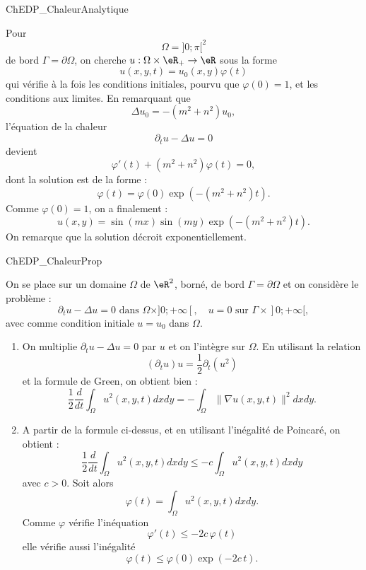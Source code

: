\medskip

\begin{corrige}{ChEDP_ChaleurAnalytique}

Pour 
$$ \Omega = ] 0 ; \pi [^2$$
de bord $\Gamma = \partial \Omega$,
on cherche $u : \Omega \times \eR_+ \rightarrow \eR$
sous la forme
\[
u(x,y,t) = u_0(x,y) \varphi(t)
\]
qui vérifie à la fois les conditions initiales, pourvu que $\varphi(0)=1$, et les conditions aux limites.
En remarquant que 
\[
\Delta u_0 = -(m^2 + n^2) u_0,
\]
l'équation de la chaleur 
\[
\partial_t u - \Delta u = 0 
\]
devient
\[
\varphi'(t) + (m^2 + n^2) \varphi(t) = 0,
\]
dont la solution est de la forme :
\[
\varphi(t) = \varphi(0) \exp ( - (m^2 + n^2) t ).
\]
Comme $\varphi(0)=1$, on a finalement :
\[
u(x,y) = \sin ( mx ) \sin ( my ) \exp ( - (m^2 + n^2) t ).
\]
On remarque que la solution décroit exponentiellement.

\end{corrige}

\medskip

\begin{corrige}{ChEDP_ChaleurProp}

On se place sur un domaine $\Omega$ de $\eR^2$, borné, de bord $\Gamma = \partial \Omega$ et on considère le problème : 
\[
\partial_t u - \Delta u = 0 \mbox{ dans } \Omega \times ]0;+\infty[, \quad u = 0 \mbox{ sur } \Gamma \times ]0;+\infty[,
\]
avec comme condition initiale $u = u_0$ dans $\Omega$.

\begin{enumerate}

\item On multiplie $\partial_t u - \Delta u = 0$ par $u$ et on l'intègre sur $\Omega$. En utilisant la relation $$(\partial_t u) u = \frac12 \partial_t (u^2)$$ et la formule de Green, on obtient bien :
\[
\frac12 \frac{d}{dt} \int_\Omega u^2(x,y,t) dxdy = - \int_\Omega \| \nabla u (x,y,t) \|^2 dx dy.
\]

\item A partir de la formule ci-dessus, et en utilisant l'inégalité de Poincaré, on obtient : 
\[
\frac12 \frac{d}{dt} \int_\Omega u^2(x,y,t) dxdy \leq - c \int_\Omega u^2 (x,y,t) dx dy
\]
avec $c>0$. Soit alors 
\[
\varphi(t) = \int_\Omega u^2(x,y,t) dxdy.
\]
Comme $\varphi$ vérifie l'inéquation
\[ \varphi'(t) \leq -2c \,\varphi(t) \]
elle vérifie aussi l'inégalité
\[
\varphi(t) \leq \varphi(0) \exp (-2c \, t).
\]
\end{enumerate}

\end{corrige}

